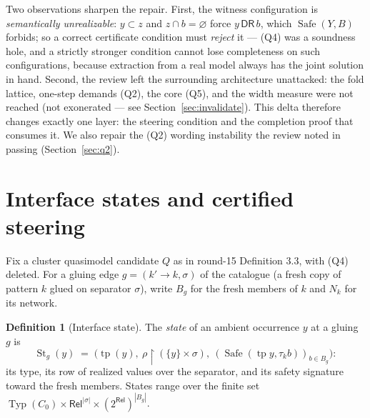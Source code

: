 \documentclass[11pt]{article}
\theoremstyle{definition}
\newtheorem{definition}[theorem]{Definition}
\newcommand{\DR}{\mathsf{DR}}
\newcommand{\Rel}{\mathsf{Rel}}
\newcommand{\Typ}{\operatorname{Typ}}
\newcommand{\tp}{\operatorname{tp}}
\newcommand{\Safe}{\operatorname{Safe}}
\newcommand{\St}{\operatorname{St}}
\begin{document}
Two observations sharpen the repair.  First, the witness configuration
is \emph{semantically unrealizable}: $y\subset z$ and $z\cap b=\varnothing$
force $y\,\DR\,b$, which $\Safe(Y,B)$ forbids; so a correct certificate
condition must \emph{reject} it --- (Q4) was a soundness hole, and a
strictly stronger condition cannot lose completeness on such
configurations, because extraction from a real model always has the
joint solution in hand.  Second, the review left the surrounding
architecture unattacked: the fold lattice, one-step demands (Q2), the
core (Q5), and the width measure were not reached (not exonerated ---
see Section~\ref{sec:invalidate}).  This delta therefore changes exactly
one layer: the steering condition and the completion proof that consumes
it.  We also repair the (Q2) wording instability the review noted in
passing (Section~\ref{sec:q2}).

\section{Interface states and certified steering}\label{sec:steer}

Fix a cluster quasimodel candidate $Q$ as in round-15
Definition 3.3, with (Q4) deleted.  For a gluing edge
$g=(k'\!\to\!k,\sigma)$ of the catalogue (a fresh copy of pattern $k$
glued on separator $\sigma$), write $B_g$ for the fresh members of $k$
and $N_k$ for its network.

\begin{definition}[Interface state]\label{def:state}
The \emph{state} of an ambient occurrence $y$ at a gluing $g$ is
\[
\St_g(y)\;=\;\bigl(\tp(y),\ \rho\restriction(\{y\}\times\sigma),\
(\Safe(\tp y,\tau_k b))_{b\in B_g}\bigr):
\]
its type, its row of realized values over the separator, and its safety
signature toward the fresh members.  States range over the finite set
$\Typ(C_0)\times\Rel^{|\sigma|}\times(2^{\Rel})^{|B_g|}$.
\end{definition}
\end{document}
